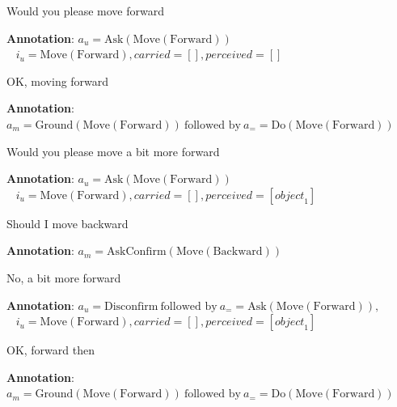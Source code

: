\begin{Transcript}[p]
\begin{dialogue} \vspace{5mm}
 Would you please move forward \\[1mm]
\begin{footnotesize}\textbf{Annotation}: $a_u\!=\!\mathrm{Ask(Move(Forward))}$\\ $\phantom{1}$\hspace{16mm} $i_u\!=\!\mathrm{Move(Forward)}, \mathit{carried}\!=\![],\mathit{perceived}\!=\![]$\end{footnotesize} \vspace{3mm}
 OK, moving forward \\[1mm]
\begin{footnotesize}\textbf{Annotation}: $a_m\!=\!\mathrm{Ground(Move(Forward)) }  \ \text{followed by} \  a_=\!=\!\mathrm{Do(Move(Forward))}$ \end{footnotesize}\vspace{3mm}
 Would you please move a bit more forward \\[1mm]
\begin{footnotesize}\textbf{Annotation}: $a_u\!=\!\mathrm{Ask(Move(Forward))}$\\$\phantom{1}$\hspace{16mm} $i_u\!=\!\mathrm{Move(Forward)}, \mathit{carried}\!=\![],\mathit{perceived}\!=\![\mathit{object}_1]$\end{footnotesize}\vspace{3mm}
 Should I move backward \\[1mm]
\begin{footnotesize}\textbf{Annotation}: $a_m\!=\!\mathrm{AskConfirm(Move(Backward))}$\end{footnotesize} \vspace{3mm}
 No, a bit more forward \\[1mm]
\begin{footnotesize}\textbf{Annotation}: $a_u\!=\!\mathrm{Disconfirm } \ \text{followed by} \  a_=\!=\!\mathrm{Ask(Move(Forward))}, $ \\$\phantom{1}$\hspace{16mm} $i_u\!=\!\mathrm{Move(Forward)}, \mathit{carried}\!=\![], \mathit{perceived}\!=\![\mathit{object}_1]$\end{footnotesize}\vspace{3mm}
 OK, forward then \\[1mm] 
\begin{footnotesize}\textbf{Annotation}: $a_m\!=\!\mathrm{Ground(Move(Forward)) }  \ \text{followed by} \ a_=\!=\!\mathrm{Do(Move(Forward))}$ \end{footnotesize} \vspace{3mm}

\end{dialogue}
\end{Transcript}
